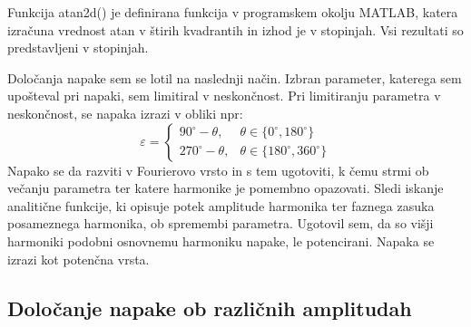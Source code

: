 \documentclass[a4paper]{article}
\begin{document}
Funkcija atan2d() je definirana funkcija v programskem okolju MATLAB, katera izračuna vrednost atan v štirih kvadrantih in izhod je v stopinjah\cite{atan}. Vsi rezultati so predstavljeni v stopinjah.

Določanja napake sem se lotil na naslednji način. Izbran parameter, katerega sem upošteval pri napaki, sem limitiral v neskončnost. Pri limitiranju parametra v neskončnost, se napaka izrazi v obliki npr:
\begin{equation}
\label{equ:def_err_inf}
\varepsilon=
\begin{cases}
90^\circ-\theta, & \theta \in \{0^\circ,180^\circ\}\\
270^\circ-\theta, & \theta \in \{180^\circ,360^\circ\}
\end{cases}
\end{equation}
Napako se da razviti v Fourierovo vrsto \cite{fourier} in s tem ugotoviti, k čemu strmi ob večanju parametra ter katere harmonike je pomembno opazovati. Sledi iskanje analitične funkcije, ki opisuje potek amplitude harmonika ter faznega zasuka posameznega harmonika, ob spremembi parametra. Ugotovil sem, da so višji harmoniki podobni osnovnemu harmoniku napake, le potencirani. Napaka se izrazi kot potenčna vrsta.

\subsection{Določanje napake ob različnih amplitudah}
\end{document}
